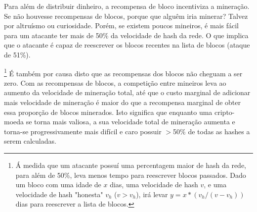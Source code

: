 
Para além de distribuir dinheiro, a recompensa de bloco incentiviza a mineração. Se não houvesse recompensas de blocos, porque que alguêm iria minerar? Talvez por altruísmo ou curiosidade. Porém, se existem poucos mineiros, é mais fácil para um atacante ter mais de 
50\% da velocidade de hash da rede. O que implica que o atacante é capaz de reescrever os blocos recentes na lista de blocos (ataque de 51\%). 

\footnote{Á medida que um atacante possuí uma percentagem maior de hash da rede, para além de 50\%, leva menos tempo para reescrever blocos passados. Dado um bloco com uma idade de $x$ dias, uma velocidade de hash $v$, e uma velocidade de hash "honesta" $v_h$ ($v > v_h$), irá levar $y = x*(v_h/(v-v_h))$ dias para reescrever a lista de blocos.}
É também por causa disto que as recompensas dos blocos não cheguam a ser zero.
Com as recompensas de blocos, a competição entre mineiros leva ao aumento da velocidade de mineração total, até que o custo marginal de adicionar mais velocidade de mineração é maior do que a recompensa marginal de obter essa proporção de blocos minerados. Isto significa que enquanto uma cripto-moeda se torna mais valiosa, a sua velocidade total de mineração aumenta e torna-se progressivamente mais difícil e caro possuir $>$50\% de todas as hashes a serem calculadas.  


